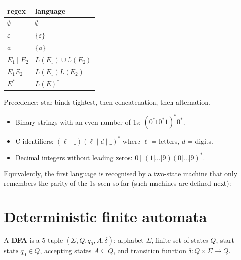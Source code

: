 \begin{center}
\begin{tabular}{ll}
\toprule
regex & language \\
\midrule
$\emptyset$ & $\emptyset$ \\
$\varepsilon$ & $\{\varepsilon\}$ \\
$a$ & $\{a\}$ \\
$E_1 \mid E_2$ & $L(E_1)\cup L(E_2)$ \\
$E_1 E_2$ & $L(E_1) L(E_2)$ \\
$E^*$ & $L(E)^*$ \\
\bottomrule
\end{tabular}
\end{center}
Precedence: star binds tightest, then concatenation, then alternation.

\begin{example}
\begin{itemize}
  \item Binary strings with an even number of 1s: $(0^* 1 0^* 1)^* 0^*$.
  \item C identifiers: $(\ell \mid \_)(\ell \mid d \mid \_)^*$ where $\ell$ = letters, $d$ = digits.
  \item Decimal integers without leading zeros: $0 \mid (1|\dots|9)(0|\dots|9)^*$.
\end{itemize}
\end{example}

Equivalently, the first language is recognised by a two-state machine that only remembers
the parity of the 1s seen so far (such machines are defined next):
\begin{center}
\end{center}

\section{Deterministic finite automata}

\begin{definition}
A \textbf{DFA} is a 5-tuple $(\Sigma, Q, q_0, A, \delta)$: alphabet $\Sigma$, finite set of
states $Q$, start state $q_0\in Q$, accepting states $A\subseteq Q$, and transition function
$\delta : Q\times\Sigma \to Q$.
\end{definition}

